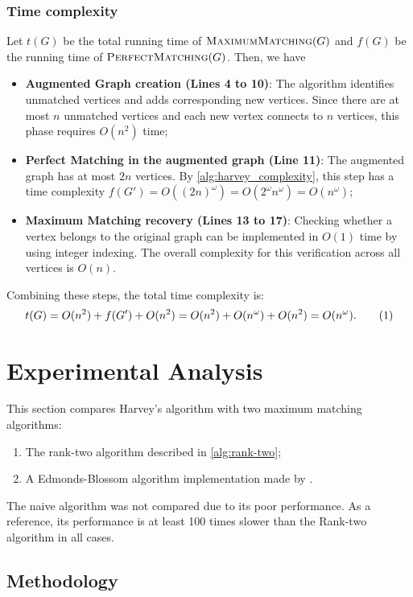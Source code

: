 \subsubsection{Time complexity}
\noindent
Let \(t(G)\) be the total running time of \(\textsc{MaximumMatching}(G)\) and \(f(G)\) be the running time of \(\textsc{PerfectMatching}(G)\). Then, we have
\begin{itemize}
\item \textbf{Augmented Graph creation (Lines 4 to 10)}:
The algorithm identifies unmatched vertices and adds corresponding new vertices. 
Since there are at most \(n\) unmatched vertices and each new vertex connects to \(n\) vertices, this phase requires \(O(n^2)\) time;

\item \textbf{Perfect Matching in the augmented graph (Line 11)}: 
The augmented graph has at most \(2n\) vertices. 
By \cref{alg:harvey_complexity}, this step has a time complexity  \(f(G') = O((2n)^\omega) = O(2^\omega n^\omega) = O(n^\omega)\);

\item \textbf{Maximum Matching recovery (Lines 13 to 17)}: 
Checking whether a vertex belongs to the original graph can be implemented in \(O(1)\) time by using integer indexing. 
The overall complexity for this verification across all vertices is \(O(n)\).
\end{itemize}
Combining these steps, the total time complexity is:
\[
t(G) = O(n^2) + f(G') + O(n^2) = O(n^2) + O(n^\omega) + O(n^2) = O(n^\omega). \numberthis \label{alg:maximum_matching_complexity}
\]

\section{Experimental Analysis}
\label{Maximum:analysis}
\noindent
This section compares Harvey's algorithm with two maximum matching algorithms:
\begin{enumerate}
   \item The rank-two algorithm described in \cref{alg:rank-two};
   \item A Edmonds-Blossom algorithm implementation made by \citet{giovana:blossom}.
\end{enumerate}
\noindent
The naive algorithm was not compared due to its poor performance.
As a reference, its performance is at least 100 times slower than the Rank-two algorithm in all cases.

\subsection{Methodology}

